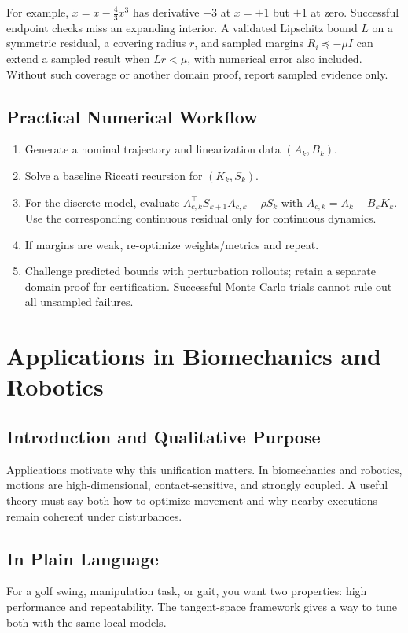 \documentclass[11pt,letterpaper]{article}
\begin{document}
For example, $\dot x=x-\frac43x^3$ has derivative $-3$ at $x=\pm1$ but $+1$ at zero. Successful endpoint checks miss an expanding interior. A validated Lipschitz bound $L$ on a symmetric residual, a covering radius $r$, and sampled margins $R_i\preceq-\mu I$ can extend a sampled result when $Lr<\mu$, with numerical error also included. Without such coverage or another domain proof, report sampled evidence only.

\subsection{Practical Numerical Workflow}
\begin{enumerate}[label=\arabic*.]
\item Generate a nominal trajectory and linearization data $(A_k,B_k)$.
\item Solve a baseline Riccati recursion for $(K_k,S_k)$.
\item For the discrete model, evaluate $A_{c,k}^\top S_{k+1}A_{c,k}-\rho S_k$ with $A_{c,k}=A_k-B_kK_k$. Use the corresponding continuous residual only for continuous dynamics.
\item If margins are weak, re-optimize weights/metrics and repeat.
\item Challenge predicted bounds with perturbation rollouts; retain a separate domain proof for certification. Successful Monte Carlo trials cannot rule out all unsampled failures.
\end{enumerate}

\section{Applications in Biomechanics and Robotics}

\subsection{Introduction and Qualitative Purpose}
Applications motivate why this unification matters. In biomechanics and robotics, motions are high-dimensional, contact-sensitive, and strongly coupled. A useful theory must say both how to optimize movement and why nearby executions remain coherent under disturbances.

\subsection{In Plain Language}
For a golf swing, manipulation task, or gait, you want two properties: high performance and repeatability. The tangent-space framework gives a way to tune both with the same local models.
\end{document}
